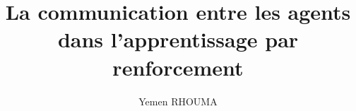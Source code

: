 \documentclass[french]{rmathesis}
\title{La communication entre les agents\\  dans l'apprentissage par renforcement}
\author{Yemen RHOUMA}
\begin{document}
	\maketitle
	\frontmatter
	
	\tableofcontents
	\listoffigures
	\listoftables
	\printnomenclature
	\mainmatter
	
	
	
	\appendix
	
	\backmatter
	
\end{document}
